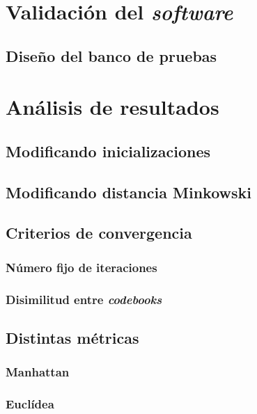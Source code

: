 \documentclass[10pt,a4paper]{article}
\begin{document}
\section{Validación del \textit{software}}

\subsection{Diseño del banco de pruebas}

\section{Análisis de resultados}

\subsection{Modificando inicializaciones}

\subsection{Modificando distancia Minkowski}

\subsection{Criterios de convergencia}

\subsubsection{Número fijo de iteraciones}

\subsubsection{Disimilitud entre \textit{codebooks}}

\subsection{Distintas métricas}

\subsubsection{Manhattan}

\subsubsection{Euclídea}
\end{document}
